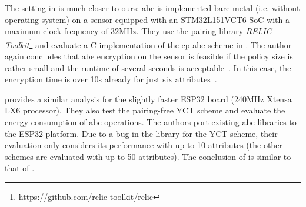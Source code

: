 The setting in \cite{borgh_attribute-based_2016} is much closer to ours: \acrshort{abe} is implemented bare-metal (i.e. without operating system) on a sensor equipped with an STM32L151VCT6 SoC with a maximum clock frequency of 32MHz.
They use the pairing library \emph{RELIC Toolkit}\footnote{\url{https://github.com/relic-toolkit/relic}} and evaluate a C implementation of the \acrshort{cp-abe} scheme in \cite{waters_ciphertext-policy_2011}.
The author again concludes that \acrshort{abe} encryption on the sensor is feasible if the policy size is rather small and the runtime of several seconds is acceptable~\cite{borgh_attribute-based_2016}.
In this case, the encryption time is over 10s already for just six attributes~\cite{borgh_attribute-based_2016}.

\cite{girgenti_feasibility_2019} provides a similar analysis for the slightly faster ESP32 board (240MHz Xtensa LX6 processor).
They also test the pairing-free YCT scheme \cite{yao_lightweight_2015} and evaluate the energy consumption of \acrshort{abe} operations.
The authors port existing \acrshort{abe} libraries to the ESP32 platform.
Due to a bug in the library for the YCT scheme, their evaluation only considers its performance with up to 10 attributes (the other schemes are evaluated with up to 50 attributes).
The conclusion of \cite{girgenti_feasibility_2019} is similar to that of \cite{borgh_attribute-based_2016}. 

